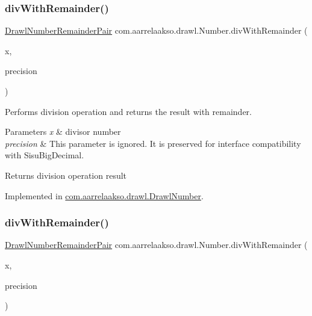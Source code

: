 \subsubsection{\texorpdfstring{div\+With\+Remainder()}{divWithRemainder()}\hspace{0.1cm}{\footnotesize\ttfamily [1/2]}}
{\footnotesize\ttfamily \hyperlink{classcom_1_1aarrelaakso_1_1drawl_1_1_drawl_number_remainder_pair}{Drawl\+Number\+Remainder\+Pair} com.\+aarrelaakso.\+drawl.\+Number.\+div\+With\+Remainder (\begin{DoxyParamCaption}\item[{@Not\+Null final \hyperlink{interfacecom_1_1aarrelaakso_1_1drawl_1_1_number}{Number}}]{x,  }\item[{final int}]{precision }\end{DoxyParamCaption})}



Performs division operation and returns the result with remainder. 


\begin{DoxyParams}{Parameters}
{\em x} & divisor number \\
\hline
{\em precision} & This parameter is ignored. It is preserved for interface compatibility with Sisu\+Big\+Decimal. \\
\hline
\end{DoxyParams}
\begin{DoxyReturn}{Returns}
division operation result 
\end{DoxyReturn}


Implemented in \hyperlink{classcom_1_1aarrelaakso_1_1drawl_1_1_drawl_number_a452c8b23180fe298592093adde0fa87e}{com.\+aarrelaakso.\+drawl.\+Drawl\+Number}.

\mbox{\label{interfacecom_1_1aarrelaakso_1_1drawl_1_1_number_ae3fd76a012e2afc4d71a3ccb93bace92}} 
\subsubsection{\texorpdfstring{div\+With\+Remainder()}{divWithRemainder()}\hspace{0.1cm}{\footnotesize\ttfamily [2/2]}}
{\footnotesize\ttfamily \hyperlink{classcom_1_1aarrelaakso_1_1drawl_1_1_drawl_number_remainder_pair}{Drawl\+Number\+Remainder\+Pair} com.\+aarrelaakso.\+drawl.\+Number.\+div\+With\+Remainder (\begin{DoxyParamCaption}\item[{final double}]{x,  }\item[{final int}]{precision }\end{DoxyParamCaption})}




